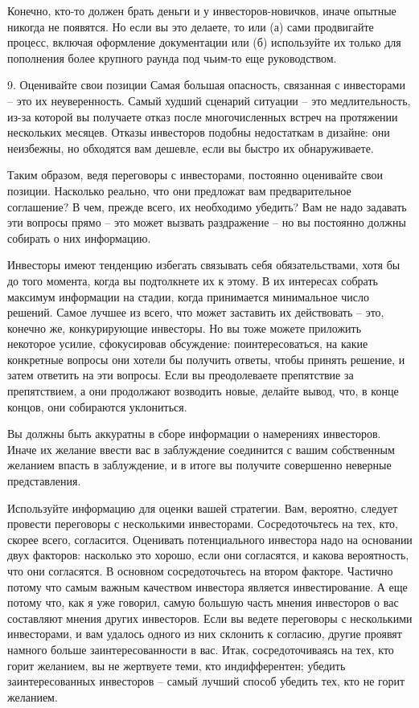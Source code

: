 \documentclass[ebook,12pt,oneside,openany]{memoir}
\begin{document}
Конечно, кто-то должен брать деньги и у инвесторов-новичков, иначе
опытные никогда не появятся. Но если вы это делаете, то или (а) сами
продвигайте процесс, включая оформление документации или (б)
используйте их только для пополнения более крупного раунда под чьим-то
еще руководством.

9. Оценивайте свои позиции Самая большая опасность, связанная с
инвесторами – это их неуверенность. Самый худший сценарий ситуации –
это медлительность, из-за которой вы получаете отказ после
многочисленных встреч на протяжении нескольких месяцев. Отказы
инвесторов подобны недостаткам в дизайне: они неизбежны, но обходятся
вам дешевле, если вы быстро их обнаруживаете.

Таким образом, ведя переговоры с инвесторами, постоянно оценивайте
свои позиции. Насколько реально, что они предложат вам предварительное
соглашение? В чем, прежде всего, их необходимо убедить? Вам не надо
задавать эти вопросы прямо – это может вызвать раздражение – но вы
постоянно должны собирать о них информацию.

Инвесторы имеют тенденцию избегать связывать себя обязательствами,
хотя бы до того момента, когда вы подтолкнете их к этому. В их
интересах собрать максимум информации на стадии, когда принимается
минимальное число решений. Самое лучшее из всего, что может заставить
их действовать – это, конечно же, конкурирующие инвесторы. Но вы тоже
можете приложить некоторое усилие, сфокусировав обсуждение:
поинтересоваться, на какие конкретные вопросы они хотели бы получить
ответы, чтобы принять решение, и затем ответить на эти вопросы. Если
вы преодолеваете препятствие за препятствием, а они продолжают
возводить новые, делайте вывод, что, в конце концов, они собираются
уклониться.

Вы должны быть аккуратны в сборе информации о намерениях инвесторов.
Иначе их желание ввести вас в заблуждение соединится с вашим
собственным желанием впасть в заблуждение, и в итоге вы получите
совершенно неверные представления.

Используйте информацию для оценки вашей стратегии. Вам, вероятно,
следует провести переговоры с несколькими инвесторами. Сосредоточьтесь
на тех, кто, скорее всего, согласится. Оценивать потенциального
инвестора надо на основании двух факторов: насколько это хорошо, если
они согласятся, и какова вероятность, что они согласятся. В основном
сосредоточьтесь на втором факторе. Частично потому что самым важным
качеством инвестора является инвестирование. А еще потому что, как я
уже говорил, самую большую часть мнения инвесторов о вас составляют
мнения других инвесторов. Если вы ведете переговоры с несколькими
инвесторами, и вам удалось одного из них склонить к согласию, другие
проявят намного больше заинтересованности в вас. Итак,
сосредоточиваясь на тех, кто горит желанием, вы не жертвуете теми, кто
индифферентен; убедить заинтересованных инвесторов – самый лучший
способ убедить тех, кто не горит желанием.
\end{document}

